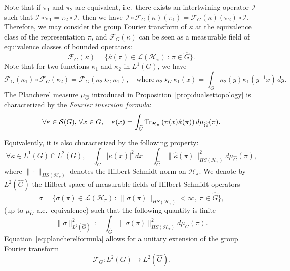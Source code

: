 \documentclass[12pt,a4paper]{amsart}
\theoremstyle{plain}
\theoremstyle{definition}
\theoremstyle{remark}
\numberwithin{equation}{section}
\theoremstyle{definition}
\def \cS{\mathcal{S}}
\def \Ghat{\widehat{G}}
\def \cH{\mathcal{H}}
\def \cF{\mathcal{F}}
\numberwithin{equation}{section}
\begin{document}
Note that if $\pi_1$ and $\pi_2$ are equivalent, i.e.~there exists an intertwining operator $\mathcal{I}$ such that $\mathcal{I}\circ \pi_1 = \pi_2 \circ \mathcal{I}$, 
then we have $\mathcal{I}\circ \cF_G(\kappa)(\pi_1) = \cF_G(\kappa)(\pi_2)\circ \mathcal{I}$. Therefore, we may consider the group Fourier transform of $\kappa$ at the 
equivalence class of the representation $\pi$, and $\cF_G(\kappa)$ can be seen as a measurable field of equivalence classes of bounded operators:
\begin{equation*}
 \cF_G(\kappa) = \{\hat{\kappa}(\pi)\in\mathcal{L}(\cH_\pi)\,:\,\pi\in\Ghat\}.
\end{equation*}
Note that for two functions $\kappa_1$ and $\kappa_2$ in $L^1(G)$, we have
\begin{equation*}
 \cF_G(\kappa_1) \circ \cF_G(\kappa_2) = \cF_G(\kappa_2 \star_G \kappa_1),\quad\mbox{where}\ \kappa_2 \star_G \kappa_1(x) = \int_G \kappa_2(y)\kappa_1(y^{-1}x)\,dy.
\end{equation*}
The Plancherel measure $\mu_{\Ghat}$ introduced in Proposition~\ref{prop:dualsettopology} is characterized by the \emph{Fourier inversion formula}:
\begin{equation}
    \label{eq:fourierinversion}
    \forall \kappa \in \cS(G),\,\forall x\in G,\quad \kappa(x) = \int_{\Ghat}{\rm Tr}_{\cH_\pi}\left(\pi(x)\hat{\kappa}(\pi)\right) d\mu_{\Ghat}(\pi).
\end{equation}

Equivalently, it is also characterized by the following property:
\begin{equation}
\label{eq:plancherelformula}
 \forall \kappa\in L^1(G)\cap L^2(G),\quad \int_G |\kappa(x)|^2\,dx = \int_{\Ghat} \|\hat{\kappa}(\pi)\|_{HS(\cH_\pi)}^2 d\mu_{\Ghat}(\pi),
\end{equation}
where $\|\cdot\|_{HS(\cH_\pi)}$ denotes the Hilbert-Schmidt norm on $\cH_\pi$. We denote by $L^2(\Ghat)$ the Hilbert space of measurable fields of Hilbert-Schmidt 
operators $$\sigma = \{\sigma(\pi)\in\mathcal{L}(\cH_\pi)\,:\,\|\sigma(\pi)\|_{HS(\cH_\pi)}<\infty,\  \pi\in\Ghat\},$$ (up to $\mu_{\Ghat}$-a.e.~equivalence) such that the following quantity is finite 
\begin{equation*}
 \|\sigma\|_{L^2(\Ghat)}^2 := \int_{\Ghat} \|\sigma(\pi)\|_{HS(\cH_\pi)}^2 d\mu_{\Ghat}(\pi).
\end{equation*}
Equation~\eqref{eq:plancherelformula} allows for a unitary extension of the group Fourier transform 
\begin{equation*}
 \cF_G: L^2(G)\rightarrow L^2(\Ghat).
\end{equation*}
\end{document}
